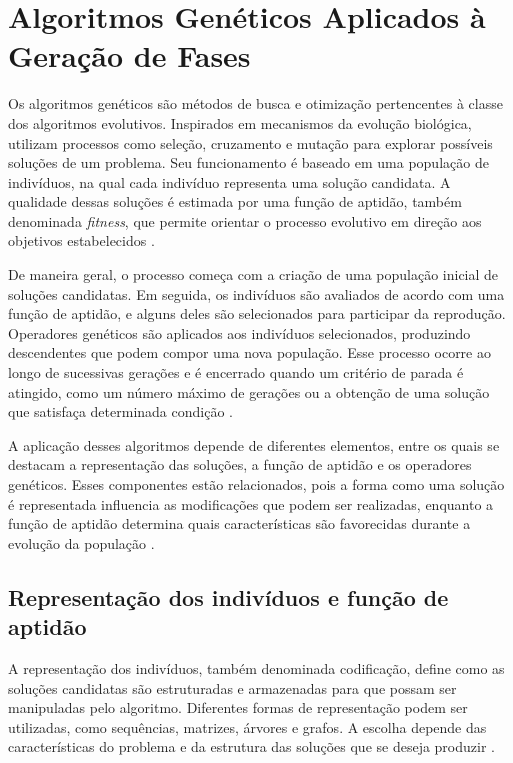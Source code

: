 \section{Algoritmos Genéticos Aplicados à Geração de Fases}
\label{sec:algoritmos-geneticos}

Os algoritmos genéticos são métodos de busca e otimização
pertencentes à classe dos algoritmos evolutivos. Inspirados
em mecanismos da evolução biológica, utilizam processos
como seleção, cruzamento e mutação para explorar possíveis
soluções de um problema. Seu funcionamento é baseado
em uma população de indivíduos, na qual cada indivíduo
representa uma solução candidata. A qualidade dessas
soluções é estimada por uma função de aptidão, também
denominada \textit{fitness}, que permite orientar o processo
evolutivo em direção aos objetivos estabelecidos
\cite{Goldberg1989,Mitchell1996,EibenSmith2003}.

De maneira geral, o processo começa com a criação de uma
população inicial de soluções candidatas. Em seguida,
os indivíduos são avaliados de acordo com uma função
de aptidão, e alguns deles são selecionados para participar
da reprodução. Operadores genéticos são aplicados aos
indivíduos selecionados, produzindo descendentes que
podem compor uma nova população. Esse processo ocorre
ao longo de sucessivas gerações e é encerrado quando
um critério de parada é atingido, como um número máximo
de gerações ou a obtenção de uma solução que satisfaça
determinada condição \cite{Goldberg1989,EibenSmith2003}.

A aplicação desses algoritmos depende de diferentes
elementos, entre os quais se destacam a representação
das soluções, a função de aptidão e os operadores
genéticos. Esses componentes estão relacionados,
pois a forma como uma solução é representada influencia
as modificações que podem ser realizadas, enquanto
a função de aptidão determina quais características
são favorecidas durante a evolução da população
\cite{Mitchell1996,EibenSmith2003}.

\subsection{Representação dos indivíduos e função de aptidão}

A representação dos indivíduos, também denominada
codificação, define como as soluções candidatas são
estruturadas e armazenadas para que possam ser
manipuladas pelo algoritmo. Diferentes formas de
representação podem ser utilizadas, como sequências,
matrizes, árvores e grafos. A escolha depende das
características do problema e da estrutura das soluções
que se deseja produzir \cite{Goldberg1989,Togelius2011,EibenSmith2003}.


